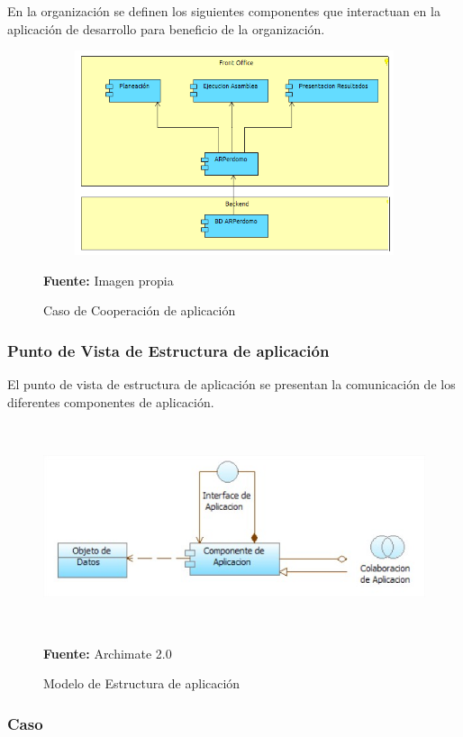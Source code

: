 En la organización se definen los siguientes componentes que interactuan en la aplicación de desarrollo para beneficio de la organización.

\begin{figure}[th!]
	\centering
	\includegraphics[width=13cm,height=6cm]{arquitectura/aplicacion/imgs/cooperacion}
	\caption{Caso de Cooperación de aplicación}{\scriptsize \textbf{Fuente:} Imagen propia}
\end{figure}


\subsubsection{Punto de Vista de Estructura de aplicación}

El punto de vista de estructura de aplicación se presentan la comunicación de los diferentes componentes de aplicación.


\begin{figure}[th!]
	\centering
	\includegraphics[width=13cm,height=6cm]{arquitectura/aplicacion/imgs/estructura-e}
	\caption{Modelo de Estructura de aplicación}{\scriptsize \textbf{Fuente:} Archimate 2.0 \cite{WEB7}}
\end{figure}

\subsubsection{Caso}

